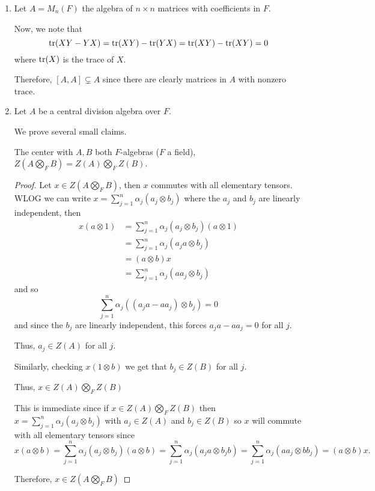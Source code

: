 \documentclass[12pt]{AlgebraQual}
\begin{document}
\begin{solution}$\,$
\begin{enumerate}[label=(\alph*)]
    \item Let $A=M_n(F)$ the algebra of $n\times n$ matrices with coefficients in $F$.

    Now, we note that $$\text{tr}(XY-YX)=\text{tr}(XY)-\text{tr}(YX)=\text{tr}(XY)-\text{tr}(XY)=0$$ where $\text{tr}(X)$ is the trace of $X.$

    Therefore, $[A,A]\subsetneq A$ since there are clearly matrices in $A$ with nonzero trace.
    \item Let $A$ be a central division algebra over $F$.

    We prove several small claims.

    \begin{claim} The center with $A,B$ both $F$-algebras ($F$ a field), $Z(A\bigotimes_F B)=Z(A)\bigotimes_F Z(B)$.
    \begin{proof} \boxed{\subset} Let $x\in Z(A\bigotimes_F B)$, then $x$ commutes with all elementary tensors. WLOG we can write $x=\sum_{j=1}^n\alpha_j(a_j\otimes b_j)$ where the $a_j$ and $b_j$ are linearly independent, then \begin{align*}
        x(a\otimes 1)&=\sum_{j=1}^n\alpha_j(a_j\otimes b_j)(a\otimes 1)\\
        &=\sum_{j=1}^n\alpha_j(a_ja\otimes b_j)\\
        &=(a\otimes b)x\\
        &=\sum_{j=1}^n\alpha_j(aa_j\otimes b_j)
    \end{align*} and so $$\sum_{j=1}^n\alpha_j((a_ja-aa_j)\otimes b_j)=0$$ and since the $b_j$ are linearly independent, this forces $a_ja-aa_j=0$ for all $j$.

    Thus, $a_j\in Z(A)$ for all $j.$

    Similarly, checking $x(1\otimes b)$ we get that $b_j\in Z(B)$ for all $j.$

    Thus, $x\in Z(A)\bigotimes_F Z(B)$

    \boxed{\supset} This is immediate since if $x\in Z(A)\bigotimes_F Z(B)$ then $x=\sum_{j=1}^n\alpha_j(a_j\otimes b_j)$ with $a_j\in Z(A)$ and $b_j\in Z(B)$ so $x$ will commute with all elementary tensors since $$x(a\otimes b)=\sum_{j=1}^n\alpha_j(a_j\otimes b_j)(a\otimes b)=\sum_{j=1}^n\alpha_j(a_ja\otimes b_jb)=\sum_{j=1}^n\alpha_j(aa_j\otimes bb_j)=(a\otimes b)x.$$

    Therefore, $x\in Z(A\bigotimes_F B)$
    \end{proof}
    \end{claim}


\end{enumerate}
\end{solution}
\end{document}
